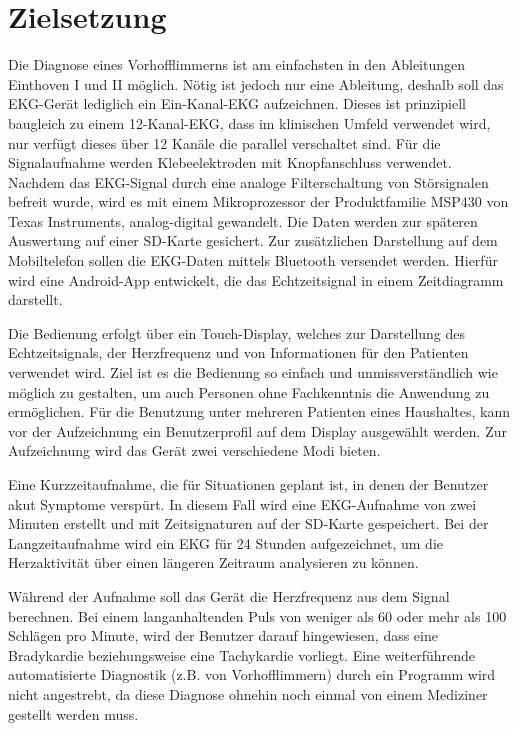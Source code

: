 
\section{Zielsetzung}

Die Diagnose eines Vorhofflimmerns ist am einfachsten in den Ableitungen Einthoven I und II möglich. Nötig ist jedoch nur eine Ableitung, deshalb soll das EKG-Gerät lediglich ein Ein-Kanal-EKG aufzeichnen. Dieses ist prinzipiell baugleich zu einem 12-Kanal-EKG, dass im klinischen Umfeld verwendet wird, nur verfügt dieses über 12 Kanäle die parallel verschaltet sind. Für die Signalaufnahme werden Klebeelektroden mit Knopfanschluss verwendet. Nachdem das EKG-Signal durch eine analoge Filterschaltung von Störsignalen befreit wurde, wird es mit einem Mikroprozessor der Produktfamilie MSP430 von Texas Instruments, analog-digital gewandelt. Die Daten werden zur späteren Auswertung auf einer SD-Karte gesichert. Zur zusätzlichen Darstellung auf dem Mobiltelefon sollen die EKG-Daten mittels Bluetooth versendet werden. Hierfür wird eine Android-App entwickelt, die das Echtzeitsignal in einem Zeitdiagramm darstellt.

Die Bedienung erfolgt über ein Touch-Display, welches zur Darstellung des Echtzeitsignals, der Herzfrequenz und von Informationen für den Patienten verwendet wird. Ziel ist es die Bedienung so einfach und unmissverständlich wie möglich zu gestalten, um auch Personen ohne Fachkenntnis die Anwendung zu ermöglichen. Für die Benutzung unter mehreren Patienten eines Haushaltes, kann vor der Aufzeichnung ein Benutzerprofil auf dem Display ausgewählt werden. Zur Aufzeichnung wird das Gerät zwei verschiedene Modi bieten. 

Eine Kurzzeitaufnahme, die für Situationen geplant ist, in denen der Benutzer akut Symptome verspürt. In diesem Fall wird eine EKG-Aufnahme von zwei Minuten erstellt und mit Zeitsignaturen auf der SD-Karte gespeichert. Bei der Langzeitaufnahme wird ein EKG für 24 Stunden aufgezeichnet, um die Herzaktivität über einen längeren Zeitraum analysieren zu können. 

Während der Aufnahme soll das Gerät die Herzfrequenz aus dem Signal berechnen. Bei einem langanhaltenden Puls von weniger als 60 oder mehr als 100 Schlägen pro Minute, wird der Benutzer darauf hingewiesen, dass eine Bradykardie beziehungsweise eine Tachykardie vorliegt. Eine weiterführende automatisierte Diagnostik (z.B. von Vorhofflimmern) durch ein Programm wird nicht angestrebt, da diese Diagnose ohnehin noch einmal von einem Mediziner gestellt werden muss.  


